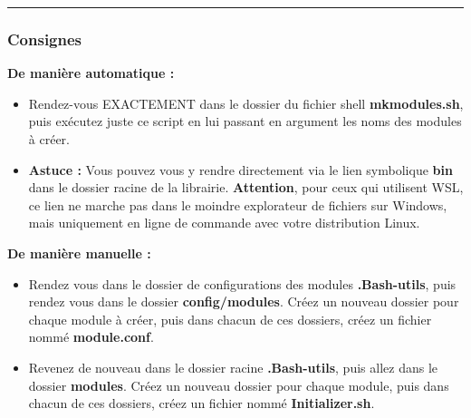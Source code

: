 \documentclass[a4paper,10pt]{article}
\begin{document}

\color{blue}\par\noindent\rule{\textwidth}{0.4pt}\color{white}

\color{blue}
\subsubsection{Consignes}\color{white}

\begin{justify}
    \textbf{De manière automatique :}

    \begin{itemize}
        \item Rendez-vous EXACTEMENT dans le dossier du fichier shell \textbf{\color{lime}mkmodules.sh}, puis exécutez juste ce script en lui passant en argument les noms des modules à créer.\\

        \item \textbf{Astuce :} Vous pouvez vous y rendre directement via le lien symbolique \textbf{\color{lime}bin} dans le dossier racine de la librairie. \textbf{Attention}, pour ceux qui utilisent WSL, ce lien ne marche pas dans le moindre explorateur de fichiers sur Windows, mais uniquement en ligne de commande avec votre distribution Linux.
    \end{itemize}
\end{justify}

\begin{justify}
    \textbf{De manière manuelle :}
    \begin{itemize}
        \item  Rendez vous dans le dossier de configurations des modules \textbf{\color{lime}.Bash-utils}, puis rendez vous dans le dossier \textbf{\color{lime}config/modules}. Créez un nouveau dossier pour chaque module à créer, puis dans chacun de ces dossiers, créez un fichier nommé \textbf{\color{lime}module.conf}.\\

        \item Revenez de nouveau dans le dossier racine \textbf{\color{lime}.Bash-utils}, puis allez dans le dossier \textbf{\color{lime}modules}. Créez un nouveau dossier pour chaque module, puis dans chacun de ces dossiers, créez un fichier nommé \textbf{\color{lime}Initializer.sh}.
    \end{itemize}
\end{justify}


\end{document}
